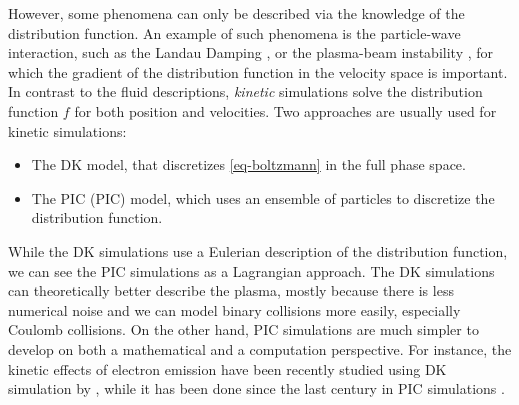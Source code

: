 \vspace{1em}
However, some phenomena can only be described via the knowledge of the distribution function.
An example of such phenomena is the particle-wave interaction, such as the Landau Damping \citep{landau1945,malmberg1964}, or the plasma-beam instability \citep{filippychev1990}, for which the gradient of the distribution function in the velocity space is important.
In contrast to the fluid descriptions, \emph{kinetic} simulations solve the distribution function $f$ for both position and velocities.
Two approaches are usually used for kinetic simulations\string:
\begin{itemize}
  \item The \ac{DK} model, that discretizes \cref{eq-boltzmann} in the full phase space.
  \item The \acl{PIC} (\acs{PIC}) model, which uses an ensemble of particles to discretize the distribution function.
\end{itemize} 
While the \ac{DK} simulations use a Eulerian description of the distribution function, we can see the \ac{PIC} simulations as a Lagrangian approach.
The \ac{DK} simulations can theoretically better describe the plasma, mostly because there is less numerical noise and we can model binary collisions more easily, especially Coulomb collisions.
On the other hand, \ac{PIC} simulations are much simpler to develop on both a mathematical and a computation perspective.
For instance, the kinetic effects of electron emission have been recently studied using \ac{DK} simulation by \citet{cagas2019}, while it has been done since the last century in \ac{PIC} simulations \citep{boswell1988}.


